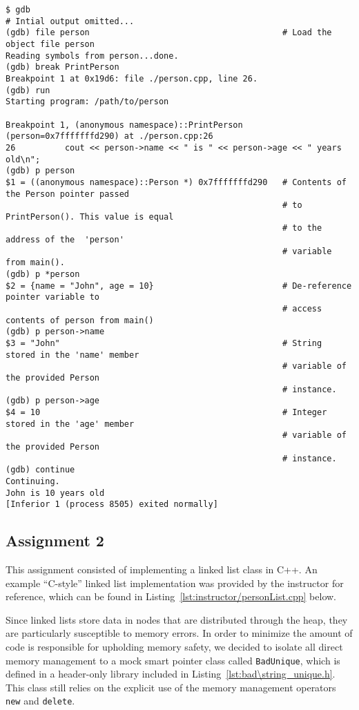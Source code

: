\documentclass[11pt, letterpaper]{article} %
\begin{document}
\begin{lstlisting}[style=labreportstyle-sh]
$ gdb
# Intial output omitted...
(gdb) file person                                       # Load the object file person
Reading symbols from person...done.
(gdb) break PrintPerson
Breakpoint 1 at 0x19d6: file ./person.cpp, line 26.
(gdb) run
Starting program: /path/to/person 

Breakpoint 1, (anonymous namespace)::PrintPerson (person=0x7fffffffd290) at ./person.cpp:26
26          cout << person->name << " is " << person->age << " years old\n";
(gdb) p person
$1 = ((anonymous namespace)::Person *) 0x7fffffffd290   # Contents of the Person pointer passed 
                                                        # to PrintPerson(). This value is equal 
                                                        # to the address of the  'person' 
                                                        # variable from main().
(gdb) p *person
$2 = {name = "John", age = 10}                          # De-reference pointer variable to
                                                        # access contents of person from main()
(gdb) p person->name
$3 = "John"                                             # String stored in the 'name' member 
                                                        # variable of the provided Person 
                                                        # instance.
(gdb) p person->age
$4 = 10                                                 # Integer stored in the 'age' member
                                                        # variable of the provided Person
                                                        # instance.
(gdb) continue 
Continuing.
John is 10 years old
[Inferior 1 (process 8505) exited normally]
\end{lstlisting}

\subsection*{Assignment 2}

This assignment consisted of implementing a linked list class in C++. An example ``C-style'' linked list implementation was provided by the instructor for reference, which can be found in Listing~\ref{lst:instructor/personList.cpp} below.

Since linked lists store data in nodes that are distributed through the heap, they are particularly susceptible to memory errors. In order to minimize the amount of code is responsible for upholding memory safety, we decided to isolate all direct memory management to a mock smart pointer class called \texttt{BadUnique}, which is defined in a header-only library included in Listing~\ref{lst:bad\string_unique.h}. This class still relies on the explicit use of the memory management operators \texttt{new} and \texttt{delete}. 
\end{document}
